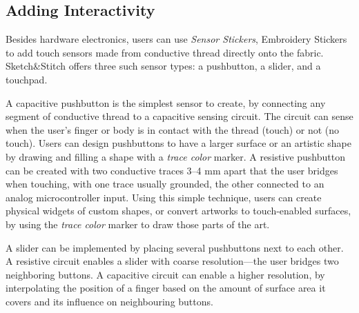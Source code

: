 \documentclass{sigchi}
\begin{document}
\subsection{Adding Interactivity}
Besides hardware electronics, users can use \textit{Sensor Stickers}, Embroidery Stickers to add touch sensors made from conductive thread directly onto the fabric. Sketch\&Stitch offers three such sensor types: a pushbutton, a slider, and a touchpad.

A capacitive pushbutton is the simplest sensor to create, by connecting any segment of conductive thread to a capacitive sensing circuit. The circuit can sense when the user's finger or body is in contact with the thread (touch) or not (no touch). Users can design pushbuttons to have a larger surface or an artistic shape by drawing and filling a shape with a \textit{trace color} marker. A resistive pushbutton can be created with two conductive traces 3--4 mm apart that the user bridges when touching, with one trace usually grounded, the other connected to an analog microcontroller input. Using this simple technique, users can create physical widgets of custom shapes, or convert artworks to touch-enabled surfaces, by using the \textit{trace color} marker to draw those parts of the art.


A slider can be implemented by placing several pushbuttons next to each other. A resistive circuit enables a slider with coarse resolution---the user bridges two neighboring buttons. A capacitive circuit can enable a higher resolution, by interpolating the position of a finger based on the amount of surface area it covers and its influence on neighbouring buttons.

\end{document}
